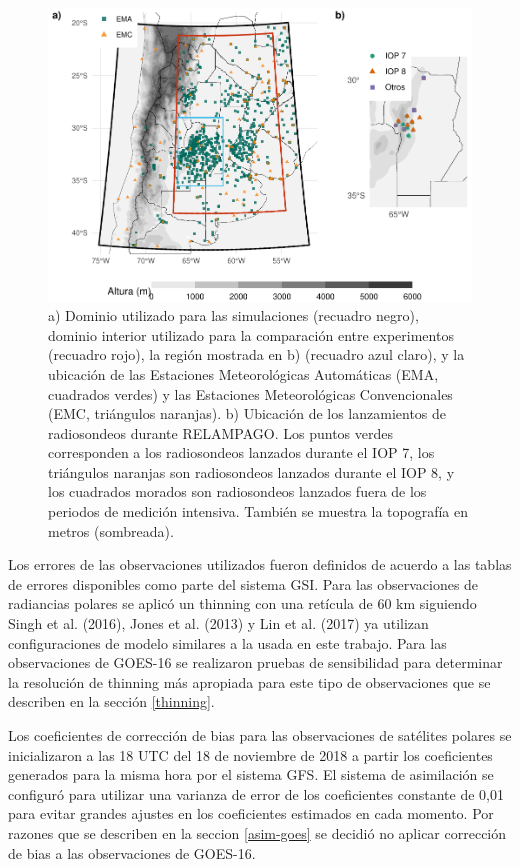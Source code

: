 \documentclass[12pt,oneside]{reedthesis}
\begin{document}
\begin{figure}

{\centering \includegraphics[width=0.8\linewidth,]{thesis_files/figure-latex/dominio-1} 

}

\caption{a) Dominio utilizado para las simulaciones (recuadro negro), dominio interior utilizado para la comparación entre experimentos (recuadro rojo), la región mostrada en b) (recuadro azul claro), y la ubicación de las Estaciones Meteorológicas Automáticas (EMA, cuadrados verdes) y las Estaciones Meteorológicas Convencionales (EMC, triángulos naranjas). b) Ubicación de los lanzamientos de radiosondeos durante RELAMPAGO. Los puntos verdes corresponden a los radiosondeos lanzados durante el IOP 7, los triángulos naranjas son radiosondeos lanzados durante el IOP 8, y los cuadrados morados son radiosondeos lanzados fuera de los periodos de medición intensiva. También se muestra la topografía en metros (sombreada).}\label{fig:dominio}
\end{figure}
Los errores de las observaciones utilizados fueron definidos de acuerdo a las tablas de errores disponibles como parte del sistema GSI. Para las observaciones de radiancias polares se aplicó un thinning con una retícula de 60 km siguiendo Singh et al. (2016), Jones et al. (2013) y Lin et al. (2017) ya utilizan configuraciones de modelo similares a la usada en este trabajo. Para las observaciones de GOES-16 se realizaron pruebas de sensibilidad para determinar la resolución de thinning más apropiada para este tipo de observaciones que se describen en la sección \ref{thinning}.

Los coeficientes de corrección de bias para las observaciones de satélites polares se inicializaron a las 18 UTC del 18 de noviembre de 2018 a partir los coeficientes generados para la misma hora por el sistema GFS. El sistema de asimilación se configuró para utilizar una varianza de error de los coeficientes constante de 0,01 para evitar grandes ajustes en los coeficientes estimados en cada momento. Por razones que se describen en la seccion \ref{asim-goes} se decidió no aplicar corrección de bias a las observaciones de GOES-16.
\end{document}
